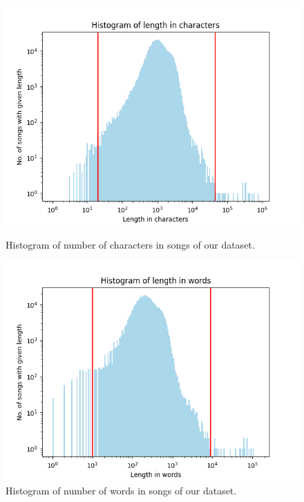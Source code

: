 \begin{figure}[!htb]
	\includegraphics[width=\linewidth]{../img/histogram_song_length_in_char.png}
	\caption{Histogram of number of characters in songs of our dataset.}\label{hist_chars}
	\endminipage\hfill
	\includegraphics[width=\linewidth]{../img/histogram_song_length_in_words.png}
	\caption{Histogram of number of words in songs of our dataset.}\label{hist_words}
	\endminipage\hfill
	
\end{figure}
